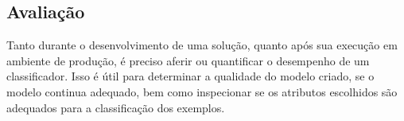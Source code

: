 





\subsection{Avaliação}\label{sec:avaliacao}

Tanto durante o desenvolvimento de uma solução, quanto após sua execução em ambiente de produção, é preciso aferir ou quantificar o desempenho de um classificador. Isso é útil para determinar a qualidade do modelo criado, se o modelo continua adequado, bem como inspecionar se os atributos escolhidos são adequados para a classificação dos exemplos.

